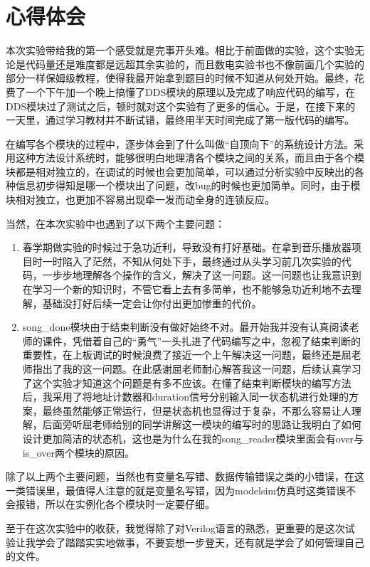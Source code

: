 \documentclass{ctexart}
\begin{document}
\section{心得体会}
本次实验带给我的第一个感受就是完事开头难。相比于前面做的实验，这个实验无论是代码量还是难度都是远超其余实验的，而且数电实验书也不像前面几个实验的部分一样保姆级教程，使得我最开始拿到题目的时候不知道从何处开始。最终，花费了一个下午加一个晚上搞懂了DDS模块的原理以及完成了响应代码的编写，在DDS模块过了测试之后，顿时就对这个实验有了更多的信心。于是，在接下来的一天里，通过学习教材并不断试错，最终用半天时间完成了第一版代码的编写。


在编写各个模块的过程中，逐步体会到了什么叫做“自顶向下”的系统设计方法。采用这种方法设计系统时，能够很明白地理清各个模块之间的关系，而且由于各个模块都是相对独立的，在调试的时候也会更加简单，可以通过分析实验中反映出的各种信息初步得知是哪一个模块出了问题，改bug的时候也更加简单。同时，由于模块相对独立，也更加不容易出现牵一发而动全身的连锁反应。

当然，在本次实验中也遇到了以下两个主要问题：
\begin{enumerate}
    \item 春学期做实验的时候过于急功近利，导致没有打好基础。在拿到音乐播放器项目时一时陷入了茫然，不知从何处下手，最终通过从头学习前几次实验的代码，一步步地理解各个操作的含义，解决了这一问题。这一问题也让我意识到在学习一个新的知识时，不管它看上去有多简单，也不能够急功近利地不去理解，基础没打好后续一定会让你付出更加惨重的代价。
    \item song_done模块由于结束判断没有做好始终不对。最开始我并没有认真阅读老师的课件，凭借着自己的“勇气”一头扎进了代码编写之中，忽视了结束判断的重要性，在上板调试的时候浪费了接近一个上午解决这一问题，最终还是屈老师指出了我的这一问题。在此感谢屈老师耐心解答我这一问题，后续认真学习了这个实验才知道这个问题是有多不应该。在懂了结束判断模块的编写方法后，我采用了将地址计数器和duration信号分别输入同一状态机进行处理的方案，最终虽然能够正常运行，但是状态机也显得过于复杂，不那么容易让人理解，后面旁听屈老师给别的同学讲解这一模块的编写时的思路让我明白了如何设计更加简洁的状态机，这也是为什么在我的song_reader模块里面会有over与is_over两个模块的原因。
\end{enumerate}

除了以上两个主要问题，当然也有变量名写错、数据传输错误之类的小错误，在这一类错误里，最值得人注意的就是变量名写错，因为modelsim仿真时这类错误不会报错，所以在实例化各个模块时一定要仔细。

至于在这次实验中的收获，我觉得除了对Verilog语言的熟悉，更重要的是这次试验让我学会了踏踏实实地做事，不要妄想一步登天，还有就是学会了如何管理自己的文件。
\end{document}

